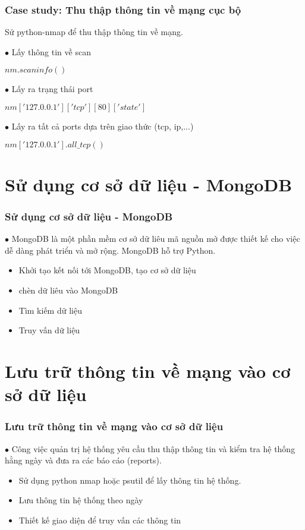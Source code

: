 \documentclass{beamer}
\begin{document}
\begin{frame}[label=vidunmap]
\frametitle{Case study: Thu thập thông tin về mạng cục bộ}
Sử python-nmap để thu thập thông tin về mạng. 

$\bullet$ Lấy thông tin về scan
\begin{example}
$nm.scaninfo()$
\end{example}
$\bullet$ Lấy ra trạng thái port 
\begin{example}
$nm['127.0.0.1']['tcp'][80]['state'] $
\end{example}
$\bullet$ Lấy ra tất cả ports dựa trên giao thức (tcp, ip,...) 
\begin{example}
$nm['127.0.0.1'].all\_tcp() $
\end{example}

\hyperlink{teptin}{}
\end{frame}

\section{Sử dụng cơ sở dữ liệu - MongoDB}
\begin{frame}[label=cosodulieu]
\frametitle{Sử dụng cơ sở dữ liệu - MongoDB}
$\bullet$ MongoDB là một phần mềm cơ sở dữ liêu mã nguồn mở được thiết kế cho việc dễ dàng phát triển và mở rộng. MongoDB hỗ trợ Python.
\begin{itemize}
\item Khởi tạo kết nối tới MongoDB, tạo cơ sở dữ liệu
\item chèn dữ liêu vào MongoDB
\item Tìm kiếm dữ liệu
\item Truy vấn dữ liệu
\end{itemize}

\hyperlink{teptin}{}
\end{frame}

\section{Lưu trữ thông tin về mạng vào cơ sở dữ liệu}
\begin{frame}[label=tonghop]
\frametitle{Lưu trữ thông tin về mạng vào cơ sở dữ liệu}
$\bullet$ Công việc quản trị hệ thống yêu cầu thu thập thông tin và kiểm tra hệ thống hằng ngày và đưa ra các báo cáo (reports).
\begin{itemize}
\item Sử dụng python nmap hoặc psutil để lấy thông tin hệ thống.
\item Lưu thông tin hệ thống theo ngày
\item Thiết kế giao diện để truy vấn các thông tin
\end{itemize}

\hyperlink{teptin}{}
\end{frame}




\end{document}
